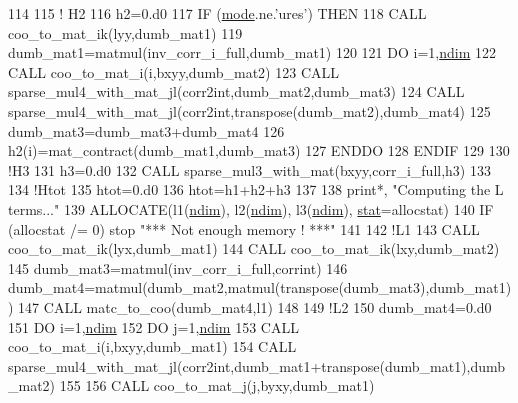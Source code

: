 \begin{DoxyCode}
114     
115     \textcolor{comment}{! H2}
116     h2=0.d0
117     \textcolor{keywordflow}{IF} (\hyperlink{namespacestoch__params_a2c3f6439fd2d66413d065b533f2a6263}{mode}.ne.\textcolor{stringliteral}{'ures'}) \textcolor{keywordflow}{THEN}
118        \textcolor{keyword}{CALL }coo\_to\_mat\_ik(lyy,dumb\_mat1)
119        dumb\_mat1=matmul(inv\_corr\_i\_full,dumb\_mat1)
120     
121        \textcolor{keywordflow}{DO} i=1,\hyperlink{namespaceparams_a2323fe1773f086e20c14f266351c482b}{ndim}
122           \textcolor{keyword}{CALL }coo\_to\_mat\_i(i,bxyy,dumb\_mat2)
123           \textcolor{keyword}{CALL }sparse\_mul4\_with\_mat\_jl(corr2int,dumb\_mat2,dumb\_mat3)
124           \textcolor{keyword}{CALL }sparse\_mul4\_with\_mat\_jl(corr2int,transpose(dumb\_mat2),dumb\_mat4)
125           dumb\_mat3=dumb\_mat3+dumb\_mat4
126           h2(i)=mat\_contract(dumb\_mat1,dumb\_mat3)
127 \textcolor{keywordflow}{       ENDDO}
128 \textcolor{keywordflow}{    ENDIF}
129 
130     \textcolor{comment}{!H3}
131     h3=0.d0
132     \textcolor{keyword}{CALL }sparse\_mul3\_with\_mat(bxyy,corr\_i\_full,h3)
133 
134     \textcolor{comment}{!Htot}
135     htot=0.d0
136     htot=h1+h2+h3
137 
138     print*, \textcolor{stringliteral}{"Computing the L terms..."}
139     \textcolor{keyword}{ALLOCATE}(l1(\hyperlink{namespaceparams_a2323fe1773f086e20c14f266351c482b}{ndim}), l2(\hyperlink{namespaceparams_a2323fe1773f086e20c14f266351c482b}{ndim}), l3(\hyperlink{namespaceparams_a2323fe1773f086e20c14f266351c482b}{ndim}), \hyperlink{namespacestat}{stat}=allocstat)
140     \textcolor{keywordflow}{IF} (allocstat /= 0) stop \textcolor{stringliteral}{"*** Not enough memory ! ***"}
141 
142     \textcolor{comment}{!L1}
143     \textcolor{keyword}{CALL }coo\_to\_mat\_ik(lyx,dumb\_mat1)
144     \textcolor{keyword}{CALL }coo\_to\_mat\_ik(lxy,dumb\_mat2)
145     dumb\_mat3=matmul(inv\_corr\_i\_full,corrint)
146     dumb\_mat4=matmul(dumb\_mat2,matmul(transpose(dumb\_mat3),dumb\_mat1))
147     \textcolor{keyword}{CALL }matc\_to\_coo(dumb\_mat4,l1)
148     
149     \textcolor{comment}{!L2}
150     dumb\_mat4=0.d0
151     \textcolor{keywordflow}{DO} i=1,\hyperlink{namespaceparams_a2323fe1773f086e20c14f266351c482b}{ndim}
152        \textcolor{keywordflow}{DO} j=1,\hyperlink{namespaceparams_a2323fe1773f086e20c14f266351c482b}{ndim}
153           \textcolor{keyword}{CALL }coo\_to\_mat\_i(i,bxyy,dumb\_mat1)
154           \textcolor{keyword}{CALL }sparse\_mul4\_with\_mat\_jl(corr2int,dumb\_mat1+transpose(dumb\_mat1),dumb\_mat2)
155           
156           \textcolor{keyword}{CALL }coo\_to\_mat\_j(j,byxy,dumb\_mat1)

\end{DoxyCode}
